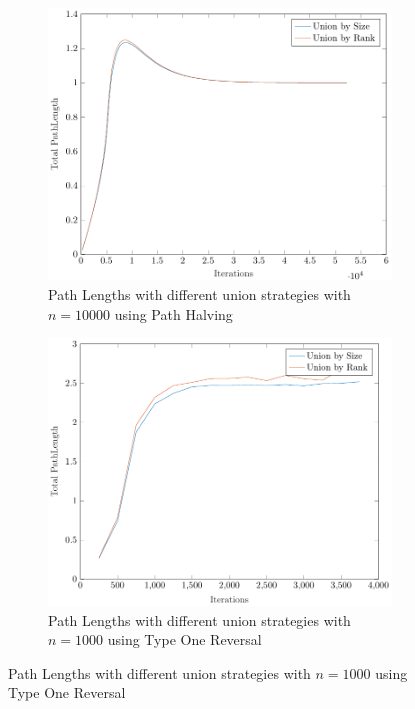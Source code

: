 \begin{figure}[ht]
    \hfill
    \begin{subfigure}{0.32\textwidth}
        \centering
        \includegraphics[width=\textwidth]{../images/plotPHNonFull10000_PathLength.pdf}
        \caption{Path Lengths with different union strategies with $n = 10000$ using Path Halving}
    \end{subfigure}
    \begin{subfigure}{0.32\textwidth}
        \centering
        \includegraphics[width=\textwidth]{../images/plotTORNonFull1000_PathLength.pdf}
        \caption{Path Lengths with different union strategies with $n = 1000$ using Type One Reversal}

\end{subfigure}
\end{figure}
